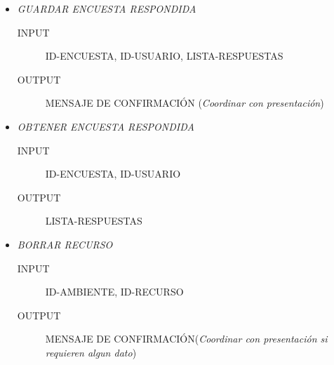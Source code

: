 \documentclass{article}
\begin{document}
\begin{description}
\begin{itemize}
			\item \emph{GUARDAR ENCUESTA RESPONDIDA}
			\begin{description}
				\item[INPUT] ID-ENCUESTA, ID-USUARIO, LISTA-RESPUESTAS
				\item[OUTPUT] MENSAJE DE CONFIRMACI\'ON (\emph{Coordinar con presentaci\'on})\\
			\end{description}
			\item \emph{OBTENER ENCUESTA RESPONDIDA}
			\begin{description}
				\item[INPUT] ID-ENCUESTA, ID-USUARIO
				\item[OUTPUT] LISTA-RESPUESTAS\\
			\end{description}
			\item \emph{BORRAR RECURSO}
			\begin{description}
				\item[INPUT] ID-AMBIENTE, ID-RECURSO
				\item[OUTPUT] MENSAJE DE CONFIRMACI\'ON(\emph{Coordinar con presentaci\'on si requieren algun dato})\\
			\end{description}
		\end{itemize}

\end{description}
\end{document}
